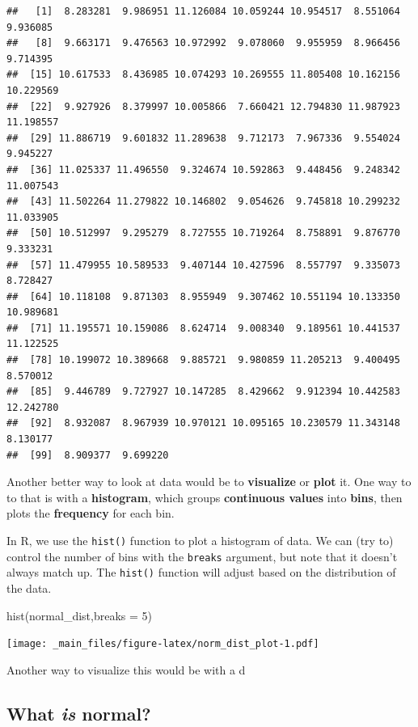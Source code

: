 \documentclass[
]{book}
\newenvironment{Shaded}{\begin{snugshade}}{\end{snugshade}}
\newcommand{\AttributeTok}[1]{\textcolor[rgb]{0.77,0.63,0.00}{#1}}
\newcommand{\DecValTok}[1]{\textcolor[rgb]{0.00,0.00,0.81}{#1}}
\newcommand{\FunctionTok}[1]{\textcolor[rgb]{0.00,0.00,0.00}{#1}}
\newcommand{\NormalTok}[1]{#1}
\begin{document}
\begin{verbatim}
##   [1]  8.283281  9.986951 11.126084 10.059244 10.954517  8.551064  9.936085
##   [8]  9.663171  9.476563 10.972992  9.078060  9.955959  8.966456  9.714395
##  [15] 10.617533  8.436985 10.074293 10.269555 11.805408 10.162156 10.229569
##  [22]  9.927926  8.379997 10.005866  7.660421 12.794830 11.987923 11.198557
##  [29] 11.886719  9.601832 11.289638  9.712173  7.967336  9.554024  9.945227
##  [36] 11.025337 11.496550  9.324674 10.592863  9.448456  9.248342 11.007543
##  [43] 11.502264 11.279822 10.146802  9.054626  9.745818 10.299232 11.033905
##  [50] 10.512997  9.295279  8.727555 10.719264  8.758891  9.876770  9.333231
##  [57] 11.479955 10.589533  9.407144 10.427596  8.557797  9.335073  8.728427
##  [64] 10.118108  9.871303  8.955949  9.307462 10.551194 10.133350 10.989681
##  [71] 11.195571 10.159086  8.624714  9.008340  9.189561 10.441537 11.122525
##  [78] 10.199072 10.389668  9.885721  9.980859 11.205213  9.400495  8.570012
##  [85]  9.446789  9.727927 10.147285  8.429662  9.912394 10.442583 12.242780
##  [92]  8.932087  8.967939 10.970121 10.095165 10.230579 11.343148  8.130177
##  [99]  8.909377  9.699220
\end{verbatim}

Another better way to look at data would be to \textbf{visualize} or \textbf{plot} it. One way to to that is with a \textbf{histogram}, which groups \textbf{continuous values} into \textbf{bins}, then plots the \textbf{frequency} for each bin.

In R, we use the \texttt{hist()} function to plot a histogram of data. We can (try to) control the number of bins with the \texttt{breaks} argument, but note that it doesn't always match up. The \texttt{hist()} function will adjust based on the distribution of the data.

\begin{Shaded}
\begin{Highlighting}[]
\FunctionTok{hist}\NormalTok{(normal\_dist,}\AttributeTok{breaks =} \DecValTok{5}\NormalTok{)}
\end{Highlighting}
\end{Shaded}

\texttt{[image: \_main\_files/figure-latex/norm\_dist\_plot-1.pdf]}

Another way to visualize this would be with a d

\hypertarget{what-is-normal}{%
\subsection{\texorpdfstring{What \emph{is} normal?}{What is normal?}}\label{what-is-normal}}
\end{document}
